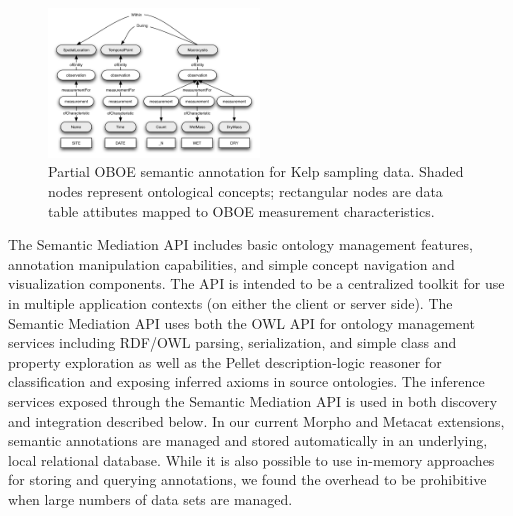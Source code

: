 

\begin{figure}[!b]
\centering
\includegraphics[width=0.5\textwidth]{images/kelp-mass-model.png}
\caption{Partial OBOE semantic annotation for Kelp sampling
  data. Shaded nodes represent ontological concepts; rectangular nodes
  are data table attibutes mapped to OBOE measurement
  characteristics.}
\label{fig:kelp-mass-model}
\end{figure}


 The Semantic Mediation API
includes basic ontology management features, annotation manipulation
capabilities, and simple concept navigation and visualization
components. The API is intended to be a centralized toolkit for use in
multiple application contexts (on either the client or server side).
The Semantic Mediation API uses both the OWL API \cite{} for ontology
management services including RDF/OWL parsing, serialization, and
simple class and property exploration as well as the Pellet
description-logic reasoner \cite{} for classification and exposing
inferred axioms in source ontologies. The inference services exposed
through the Semantic Mediation API is used in both discovery and
integration described below.
In our current Morpho and Metacat extensions, semantic annotations are
managed and stored automatically in an underlying, local relational
database. While it is also possible to use in-memory approaches for
storing and querying annotations, we found the overhead to be
prohibitive when large numbers of data sets are managed.

